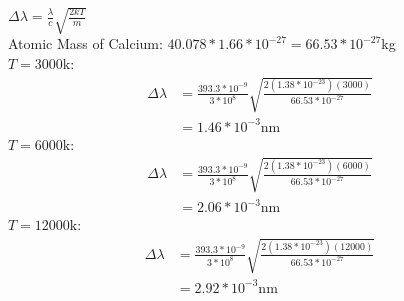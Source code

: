 \documentclass{article}
\begin{document}
\begin{enumerate}
    $\Delta\lambda=\frac{\lambda}{c}\sqrt{\frac{2kT}{m}}$\\
    Atomic Mass of Calcium: $40.078*1.66*10^{-27}=66.53*10^{-27}$kg\\
    $T=3000\text{k}:$\\
    \begin{align*}
        \Delta\lambda &= \frac{393.3*10^{-9}}{3*10^8}\sqrt{\frac{2(1.38*10^{-23})(3000)}{66.53*10^{-27}}}\\
        &= 1.46*10^{-3}\text{nm}
    \end{align*}
    $T=6000\text{k}:$\\
    \begin{align*}
        \Delta\lambda &= \frac{393.3*10^{-9}}{3*10^8}\sqrt{\frac{2(1.38*10^{-23})(6000)}{66.53*10^{-27}}}\\
        &= 2.06*10^{-3}\text{nm}
    \end{align*}
    $T=12000\text{k}:$
    \begin{align*}
        \Delta\lambda &= \frac{393.3*10^{-9}}{3*10^8}\sqrt{\frac{2(1.38*10^{-23})(12000)}{66.53*10^{-27}}}\\
        &= 2.92*10^{-3}\text{nm}
    \end{align*}
    
\end{enumerate}
\end{document}
